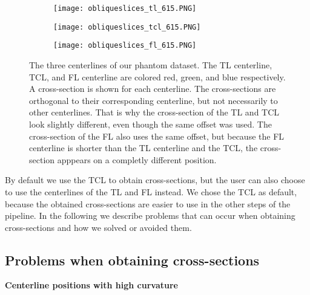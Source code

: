 \documentclass[thesis.tex]{subfiles}
\begin{document}
\begin{figure}
	\begin{subfigure}[t]{0.45\textwidth}
		\texttt{[image: obliqueslices\_tl\_615.PNG]}
	\caption{}		
	\end{subfigure}
\hspace{0.05\textwidth}
	\begin{subfigure}[t]{0.45\textwidth}
		\texttt{[image: obliqueslices\_tcl\_615.PNG]}		
\caption{}	
	\end{subfigure}
\centering
\begin{subfigure}[t]{0.45\textwidth}
		\texttt{[image: obliqueslices\_fl\_615.PNG]}		
\caption{}	
	\end{subfigure}
	\caption{The three centerlines of our phantom dataset. The TL centerline, TCL, and FL centerline are colored red, green, and blue respectively. A cross-section is shown for each centerline. The cross-sections are orthogonal to their corresponding centerline, but not necessarily to other centerlines. That is why the cross-section of the TL and TCL look slightly different, even though the same offset was used. The cross-section of the FL also uses the same offset, but because the FL centerline is shorter than the TL centerline and the TCL, the cross-section apppears on a completly different position.}
\label{fig:obliqueslices}
\end{figure}



By default we use the TCL to obtain cross-sections, but the user can also choose to use the centerlines of the TL and FL instead. We chose the TCL as default, because the obtained cross-sections are easier to use in the other steps of the pipeline.
In the following we describe problems that can occur when obtaining cross-sections and how we solved or avoided them. 

\subsection{Problems when obtaining cross-sections}
\label{problems_crosssections}
\textbf{Centerline positions with high curvature} 
\end{document}
